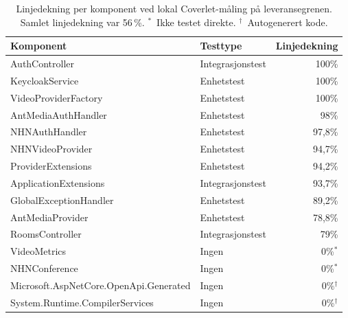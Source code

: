 \begin{table}[H]
\centering
\begin{tabular}{llr}
\toprule
\textbf{Komponent} & \textbf{Testtype} & \textbf{Linjedekning} \\
\midrule
AuthController         & Integrasjonstest & 100\% \\
KeycloakService        & Enhetstest       & 100\% \\
VideoProviderFactory   & Enhetstest       & 100\% \\
AntMediaAuthHandler    & Enhetstest       &  98\% \\
NHNAuthHandler         & Enhetstest       & 97,8\% \\
NHNVideoProvider       & Enhetstest       & 94,7\% \\
ProviderExtensions     & Enhetstest       & 94,2\% \\
ApplicationExtensions  & Integrasjonstest & 93,7\% \\
GlobalExceptionHandler & Enhetstest       & 89,2\% \\
AntMediaProvider       & Enhetstest       & 78,8\% \\
RoomsController        & Integrasjonstest & 79\% \\
\midrule
VideoMetrics           & Ingen & 0\%$^*$ \\
NHNConference          & Ingen & 0\%$^*$ \\
Microsoft.AspNetCore.OpenApi.Generated & Ingen & 0\%$^\dagger$ \\
System.Runtime.CompilerServices        & Ingen & 0\%$^\dagger$ \\
\bottomrule
\end{tabular}
\caption{Linjedekning per komponent ved lokal Coverlet-måling på
leveransegrenen. Samlet linjedekning var 56\,\%.
$^*$~Ikke testet direkte. $^\dagger$~Autogenerert kode.}
\label{tab:testresultater}
\end{table}
